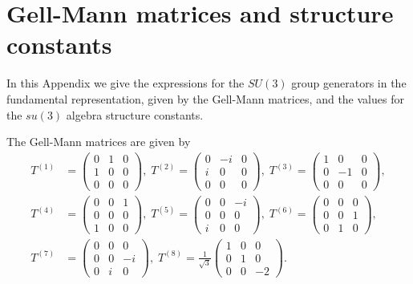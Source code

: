 
\chapter{Gell-Mann matrices and structure constants}
\label{apex_SU3}

In this Appendix we give the expressions for the $SU(3)$ group generators in the fundamental representation, given by the Gell-Mann matrices, and the values for the $su(3)$ algebra structure constants.


The Gell-Mann matrices are given by
\begin{align}
T^{(1)}&=\begin{pmatrix}
0 & 1 & 0 \\ 
1 & 0 & 0 \\ 
0 & 0 & 0
\end{pmatrix},\;
T^{(2)}=\begin{pmatrix}
0 & -i & 0 \\ 
i & 0 & 0 \\ 
0 & 0 & 0
\end{pmatrix},\;
T^{(3)}=\begin{pmatrix}
1 & 0 & 0 \\ 
0 & -1 & 0 \\ 
0 & 0 & 0
\end{pmatrix}, \nonumber \\
T^{(4)}&=\begin{pmatrix}
0 & 0 & 1 \\ 
0 & 0 & 0 \\ 
1 & 0 & 0
\end{pmatrix},\;
T^{(5)}=\begin{pmatrix}
0 & 0 & -i \\ 
0 & 0 & 0 \\ 
i & 0 & 0
\end{pmatrix},\;
T^{(6)}=\begin{pmatrix}
0 & 0 & 0 \\ 
0 & 0 & 1 \\ 
0 & 1 & 0
\end{pmatrix}, \nonumber \\
T^{(7)}&=\begin{pmatrix}
0 & 0 & 0 \\ 
0 & 0 & -i \\ 
0 & i & 0
\end{pmatrix},\;
T^{(8)}=\frac{1}{\sqrt{3}}\begin{pmatrix}
1 & 0 & 0 \\ 
0 & 1 & 0 \\ 
0 & 0 & -2
\end{pmatrix}.
\end{align}

